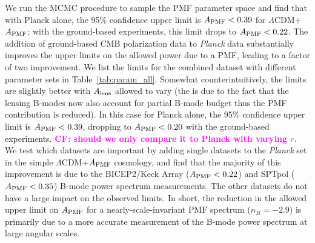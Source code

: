 \documentclass[apj]{emulateapj}
\newcommand{\apmf}{\ensuremath{A_{\rm PMF}}}
\newcommand{\alens}{\ensuremath{A_{\rm lens}}}
\newcommand{\lcdm}{\ensuremath{\Lambda}CDM}
\newcommand{\planck}{{\sl Planck}}
\newcommand{\bicepkeck}{BICEP2/Keck Array}
\newcommand{\sptpol}{SPTpol}
\begin{document}
We run the MCMC procedure to sample the PMF parameter space and find that with Planck alone, the 95\% confidence upper limit is $\apmf <  \upperAplk$ for \lcdm{}+\apmf{}; with the ground-based experiments, this limit drops to $\apmf <  \upperAall$. The addition of ground-based CMB polarization data to \planck{} data substantially improves the upper limits on the allowed power due to a PMF, leading to a factor of two improvement. We list the limits for the combined dataset  with different parameter sets in Table~\ref{tab:param_all}. 
Somewhat counterintuitively, the limits are slightly better with \alens{} allowed to vary (the is due to the fact that the lensing B-modes now also account for partial B-mode budget thus the PMF contribution is reduced). 
In this case for  Planck alone, the 95\% confidence upper limit is $\apmf <  \upperAplkalens$, dropping to $\apmf <  \upperAallalens$ with the ground-based experiments. \textbf{\textcolor{magenta}{CF: should we only compare it to Planck with varying $r$.}}
We test which datasets are important by adding single datasets to the \planck{} set in the simple \lcdm{}+\apmf{} cosmology, and find that the majority of this improvement is due to the \bicepkeck{} ($\apmf <  \upperAbicep$) and \sptpol{} ($\apmf <  \upperAsptpol$) B-mode power spectrum measurements. 
The other datasets do not have a large impact on the observed limits. 
In short, the reduction in the allowed upper limit on \apmf{} for a nearly-scale-invariant PMF spectrum ($n_B=-2.9$) is primarily due to a more accurate measurement of the B-mode power spectrum at large angular scales. 
\end{document}
